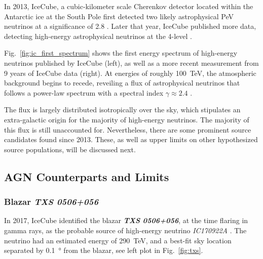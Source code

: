 In 2013, IceCube, a cubic-kilometer scale Cherenkov detector located within the Antarctic ice at the South Pole first detected two likely astrophysical \unit{\peta\eV} neutrinos at a significance of \SI{2.8}{\sigma} . Later that year, IceCube published more data, detecting high-energy astrophysical neutrinos at the \SI{4}{\sigma}-level .

Fig.~\ref{fig:ic_first_spectrum} shows the first energy spectrum of high-energy neutrinos published by IceCube (left), as well as a more recent measurement from 9 years of IceCube data (right). At energies of roughly \SI{100}{\tera\eV}, the atmospheric background begins to recede, reveiling a flux of astrophysical neutrinos that follows a power-law spectrum with a spectral index $\gamma\approx2.4$ .

The flux is largely distributed isotropically over the sky, which stipulates an extra-galactic origin for the majority of high-energy neutrinos. The majority of this flux is still unaccounted for. Nevertheless, there are some prominent source candidates found since 2013. These, as well as upper limits on other hypothesized source populations, will be discussed next.

\subsection{AGN Counterparts and Limits}

\subsubsection{Blazar \emph{TXS 0506+056}}
In 2017, IceCube identified the blazar \textbf{\emph{TXS 0506+056}}, at the time flaring in gamma rays, as the probable source of high-energy neutrino \emph{IC170922A} . The neutrino had an estimated energy of \SI{290}{\tera\eV}, and a best-fit sky location separated by \SI{0.1}{\degree} from the blazar, see left plot in Fig.~\ref{fig:txs}.

